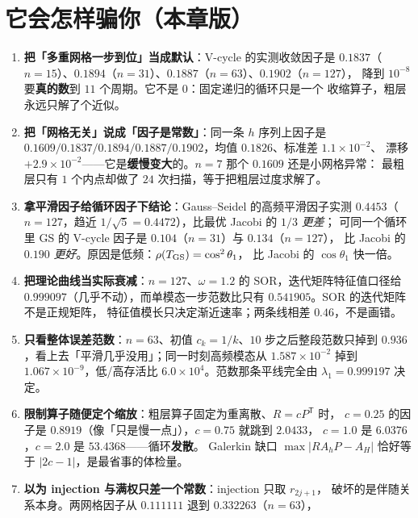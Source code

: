 \section{它会怎样骗你（本章版）}

\begin{enumerate}
  \item \textbf{把「多重网格一步到位」当成默认}：V-cycle 的实测收敛因子是
        $0.1837$（$n=15$）、$0.1894$（$n=31$）、$0.1887$（$n=63$）、$0.1902$（$n=127$），
        降到 $10^{-8}$ 要\textbf{真的数}到 $11$ 个周期。它不是 $0$：固定递归的循环只是一个
        收缩算子，粗层永远只解了个近似。
  \item \textbf{把「网格无关」说成「因子是常数」}：同一条 $h$ 序列上因子是
        $0.1609/0.1837/0.1894/0.1887/0.1902$，均值 $0.1826$、标准差 $1.1\times10^{-2}$、
        漂移 $+2.9\times10^{-2}$——它是\textbf{缓慢变大}的。$n=7$ 那个 $0.1609$ 还是小网格异常：
        最粗层只有 $1$ 个内点却做了 $24$ 次扫描，等于把粗层过度求解了。
  \item \textbf{拿平滑因子给循环因子下结论}：Gauss--Seidel 的高频平滑因子实测
        $0.4453$（$n=127$，趋近 $1/\sqrt5=0.4472$），比最优 Jacobi 的 $1/3$ \emph{更差}；
        可同一个循环里 GS 的 V-cycle 因子是 $0.104$（$n=31$）与 $0.134$（$n=127$），
        比 Jacobi 的 $0.190$ \emph{更好}。原因是低频：$\rho(T_{\rm GS})=\cos^2\theta_1$，
        比 Jacobi 的 $\cos\theta_1$ 快一倍。
  \item \textbf{把理论曲线当实际衰减}：$n=127$、$\omega=1.2$ 的 SOR，迭代矩阵特征值口径给
        $0.999097$（几乎不动），而单模态一步范数比只有 $0.541905$。SOR 的迭代矩阵不是正规矩阵，
        特征值模长只决定渐近速率；两条线相差 $0.46$，不是画错。
  \item \textbf{只看整体误差范数}：$n=63$、初值 $c_k=1/k$、$10$ 步之后整段范数只掉到
        $0.936$，看上去「平滑几乎没用」；同一时刻高频模态从 $1.587\times10^{-2}$ 掉到
        $1.067\times10^{-9}$，低/高存活比 $6.0\times10^{4}$。范数那条平线完全由
        $\lambda_1=0.999197$ 决定。
  \item \textbf{限制算子随便定个缩放}：粗层算子固定为重离散、$R=cP^{\mathsf T}$ 时，
        $c=0.25$ 的因子是 $0.8919$（像「只是慢一点」），$c=0.75$ 就跳到 $2.0433$，
        $c=1.0$ 是 $6.0376$，$c=2.0$ 是 $53.4368$——循环\textbf{发散}。
        Galerkin 缺口 $\max|RA_hP-A_H|$ 恰好等于 $|2c-1|$，是最省事的体检量。
  \item \textbf{以为 injection 与满权只差一个常数}：injection 只取 $r_{2j+1}$，
        破坏的是伴随关系本身。两网格因子从 $0.111111$ 退到 $0.332263$（$n=63$），

\end{enumerate}
